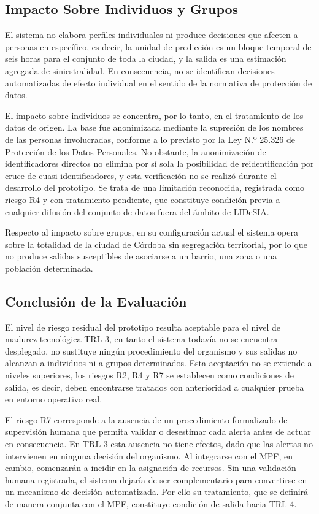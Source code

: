 \subsection{Impacto Sobre Individuos y Grupos}\label{impacto-sobre-individuos-y-grupos}

El sistema no elabora perfiles individuales ni produce decisiones que afecten a personas en específico, es decir, la unidad de predicción es un bloque temporal de seis horas para el conjunto de toda la ciudad, y la salida es una estimación agregada de siniestralidad. En consecuencia, no se identifican decisiones automatizadas de efecto individual en el sentido de la normativa de protección de datos.

El impacto sobre individuos se concentra, por lo tanto, en el tratamiento de los datos de origen. La base fue anonimizada mediante la supresión de los nombres de las personas involucradas, conforme a lo previsto por la Ley N.º 25.326 de Protección de los Datos Personales. No obstante, la anonimización de identificadores directos no elimina por sí sola la posibilidad de reidentificación por cruce de cuasi-identificadores, y esta verificación no se realizó durante el desarrollo del prototipo. Se trata de una limitación reconocida, registrada como riesgo R4 y con tratamiento pendiente, que constituye condición previa a cualquier difusión del conjunto de datos fuera del ámbito de LIDeSIA.

Respecto al impacto sobre grupos, en su configuración actual el sistema opera sobre la totalidad de la ciudad de Córdoba sin segregación territorial, por lo que no produce salidas susceptibles de asociarse a un barrio, una zona o una población determinada.

\subsection{Conclusión de la Evaluación}\label{conclusiuxf3n-de-la-evaluaciuxf3n}

El nivel de riesgo residual del prototipo resulta aceptable para el nivel de madurez tecnológica TRL 3, en tanto el sistema todavía no se encuentra desplegado, no sustituye ningún procedimiento del organismo y sus salidas no alcanzan a individuos ni a grupos determinados. Esta aceptación no se extiende a niveles superiores, los riesgos R2, R4 y R7 se establecen como condiciones de salida, es decir, deben encontrarse tratados con anterioridad a cualquier prueba en entorno operativo real.

El riesgo R7 corresponde a la ausencia de un procedimiento formalizado de supervisión humana que permita validar o desestimar cada alerta antes de actuar en consecuencia. En TRL 3 esta ausencia no tiene efectos, dado que las alertas no intervienen en ninguna decisión del organismo. Al integrarse con el MPF, en cambio, comenzarán a incidir en la asignación de recursos. Sin una validación humana registrada, el sistema dejaría de ser complementario para convertirse en un mecanismo de decisión automatizada. Por ello su tratamiento, que se definirá de manera conjunta con el MPF, constituye condición de salida hacia TRL 4.

